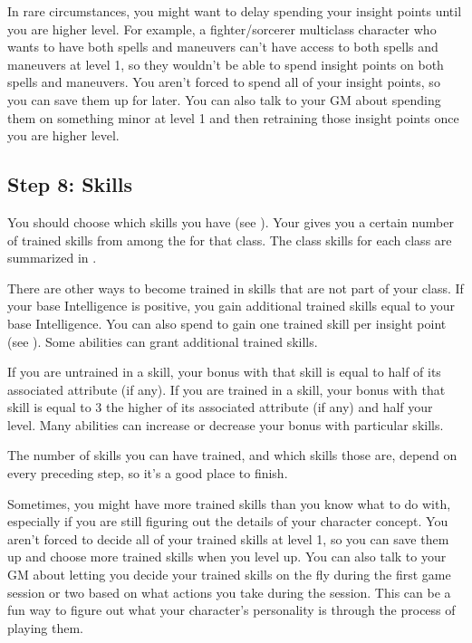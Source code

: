         In rare circumstances, you might want to delay spending your insight points until you are higher level.
        For example, a fighter/sorcerer multiclass character who wants to have both spells and maneuvers can't have access to both spells and maneuvers at level 1, so they wouldn't be able to spend insight points on both spells and maneuvers.
        You aren't forced to spend all of your insight points, so you can save them up for later.
        You can also talk to your GM about spending them on something minor at level 1 and then retraining those insight points once you are higher level.

    \subsection{Step 8: Skills}
        You should choose which skills you have  (see ).
        Your  gives you a certain number of trained skills from among the  for that class.
        The class skills for each class are summarized in .

        There are other ways to become trained in skills that are not part of your class.
        If your base Intelligence is positive, you gain additional trained skills equal to your base Intelligence.
        You can also spend  to gain one trained skill per insight point (see ).
        Some abilities can grant additional trained skills.

        If you are untrained in a skill, your bonus with that skill is equal to half of its associated attribute (if any).
        If you are trained in a skill, your bonus with that skill is equal to 3 \add the higher of its associated attribute (if any) and half your level.
        Many abilities can increase or decrease your bonus with particular skills.

        The number of skills you can have trained, and which skills those are, depend on every preceding step, so it's a good place to finish.

        Sometimes, you might have more trained skills than you know what to do with, especially if you are still figuring out the details of your character concept.
        You aren't forced to decide all of your trained skills at level 1, so you can save them up and choose more trained skills when you level up.
        You can also talk to your GM about letting you decide your trained skills on the fly during the first game session or two based on what actions you take during the session.
        This can be a fun way to figure out what your character's personality is through the process of playing them.

